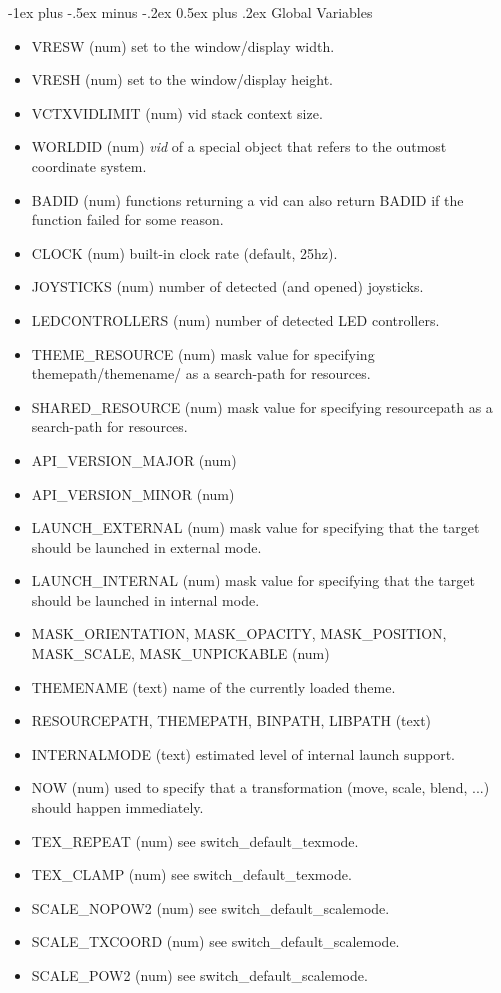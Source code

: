 \documentclass[10pt,landscape]{article}
\makeatletter
\renewcommand{\section}{\@startsection{section}{1}{0mm}%
                                {-1ex plus -.5ex minus -.2ex}%
                                {0.5ex plus .2ex}%
                                {\normalfont\large\bfseries}}
\makeatother
\begin{document}
\section{Global Variables}
	\begin{itemize}
		\item VRESW (num) set to the window/display width.
		\item VRESH (num) set to the window/display height.
		\item VCTXVIDLIMIT (num) vid stack context size.
		\item WORLDID (num) \emph{vid} of a special object that refers to the outmost coordinate system.
		\item BADID (num) functions returning a vid can also return BADID if the function failed for some reason.
		\item CLOCK (num) built-in clock rate (default, 25hz).
		\item JOYSTICKS (num) number of detected (and opened) joysticks.
		\item LEDCONTROLLERS (num) number of detected LED controllers.
		\item THEME\_RESOURCE (num) mask value for specifying themepath/themename/ as a search-path for resources.
		\item SHARED\_RESOURCE (num) mask value for specifying resourcepath as a search-path for resources.
		\item API\_VERSION\_MAJOR (num)
		\item API\_VERSION\_MINOR (num)
		\item LAUNCH\_EXTERNAL (num) mask value for specifying that the target should be launched in external mode.
		\item LAUNCH\_INTERNAL (num) mask value for specifying that the target should be launched in internal mode.
		\item MASK\_ORIENTATION, MASK\_OPACITY, MASK\_POSITION, MASK\_SCALE, MASK\_UNPICKABLE (num)
		\item THEMENAME (text) name of the currently loaded theme.
		\item RESOURCEPATH, THEMEPATH, BINPATH, LIBPATH (text)
		\item INTERNALMODE (text) estimated level of internal launch support.
		\item NOW (num) used to specify that a transformation (move, scale, blend, ...) should happen immediately.
		\item TEX\_REPEAT (num) see switch\_default\_texmode.
		\item TEX\_CLAMP (num) see switch\_default\_texmode.
		\item SCALE\_NOPOW2 (num) see switch\_default\_scalemode.
		\item SCALE\_TXCOORD (num) see switch\_default\_scalemode.
		\item SCALE\_POW2 (num) see switch\_default\_scalemode.
	\end{itemize}
\pagebreak
\end{document}
